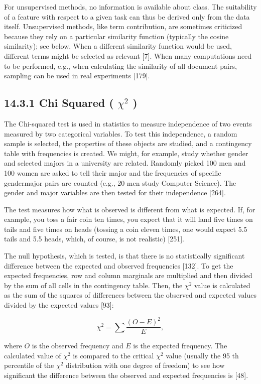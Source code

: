 \documentclass[10pt]{book}
\begin{document}
For unsupervised methods, no information is available about class. The suitability of a feature with respect to a given task can thus be derived only from the data itself. Unsupervised methods, like term contribution, are sometimes criticized because they rely on a particular similarity function (typically the cosine similarity); see below. When a different similarity function would be used, different terms might be selected as relevant [7]. When many computations need to be performed, e.g., when calculating the similarity of all document pairs, sampling can be used in real experiments [179].

\subsection*{14.3.1 Chi Squared ( $\chi^{2}$ )}
The Chi-squared test is used in statistics to measure independence of two events measured by two categorical variables. To test this independence, a random sample is selected, the properties of these objects are studied, and a contingency table with frequencies is created. We might, for example, study whether gender and selected majors in a university are related. Randomly picked 100 men and 100 women are asked to tell their major and the frequencies of specific gendermajor pairs are counted (e.g., 20 men study Computer Science). The gender and major variables are then tested for their independence [264].

The test measures how what is observed is different from what is expected. If, for example, you toss a fair coin ten times, you expect that it will land five times on tails and five times on heads (tossing a coin eleven times, one would expect 5.5 tails and 5.5 heads, which, of course, is not realistic) [251].

The null hypothesis, which is tested, is that there is no statistically significant difference between the expected and observed frequencies [132]. To get the expected frequencies, row and column marginals are multiplied and then divided by the sum of all cells in the contingency table. Then, the $\chi^{2}$ value is calculated as the sum of the squares of differences between the observed and expected values divided by the expected values [93]:


\begin{equation*}
\chi^{2}=\sum \frac{(O-E)^{2}}{E}, \tag{14.1}
\end{equation*}


where $O$ is the observed frequency and $E$ is the expected frequency. The calculated value of $\chi^{2}$ is compared to the critical $\chi^{2}$ value (usually the 95 th percentile of the $\chi^{2}$ distribution with one degree of freedom) to see how significant the difference between the observed and expected frequencies is [48].
\end{document}
